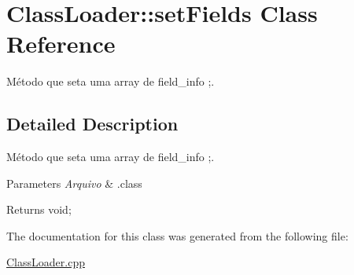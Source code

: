 \hypertarget{class_class_loader_1_1set_fields}{}\section{Class\+Loader\+:\+:set\+Fields Class Reference}
\label{class_class_loader_1_1set_fields}


Método que seta uma array de field\+\_\+info ;.  




\subsection{Detailed Description}
Método que seta uma array de field\+\_\+info ;. 


\begin{DoxyParams}{Parameters}
{\em Arquivo} & .class \\
\hline
\end{DoxyParams}
\begin{DoxyReturn}{Returns}
void; 
\end{DoxyReturn}


The documentation for this class was generated from the following file\+:\begin{DoxyCompactItemize}
\item 
\hyperlink{_class_loader_8cpp}{Class\+Loader.\+cpp}\end{DoxyCompactItemize}
